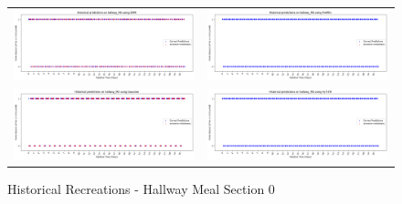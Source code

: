 \begin{figure}
  \begin{tabular}{cc}
    {\includegraphics[width = 3in]{images/results/Historical_hallway_M0_DMM.png}} &
    {\includegraphics[width = 3in]{images/results/Historical_hallway_M0_FreMEn.png}} \\
    {\includegraphics[width = 3in]{images/results/Historical_hallway_M0_Gaussian.png}} &
    {\includegraphics[width = 3in]{images/results/Historical_hallway_M0_HyT-EM.png}} \\
  \end{tabular}
  \caption{Historical Recreations - Hallway Meal Section 0}
\end{figure}

